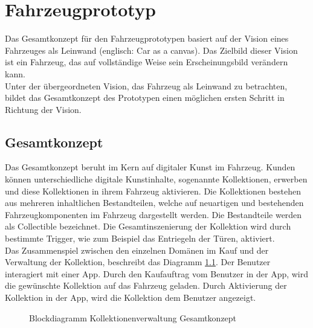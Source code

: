 \chapter{Fahrzeugprototyp}
\label{cha:Prototyp}
Das Gesamtkonzept für den Fahrzeugprototypen basiert auf der Vision eines \glqq Fahrzeuges als Leinwand\grqq{} (englisch: \glqq Car as a canvas\grqq{}). Das Zielbild dieser Vision ist ein Fahrzeug, das auf vollständige Weise sein Erscheinungsbild verändern kann. \\
Unter der übergeordneten Vision, das Fahrzeug als Leinwand zu betrachten, bildet das Gesamtkonzept des Prototypen einen möglichen ersten Schritt in Richtung der Vision.
\section{Gesamtkonzept}
Das Gesamtkonzept beruht im Kern auf digitaler Kunst im Fahrzeug. Kunden können unterschiedliche digitale Kunstinhalte, sogenannte Kollektionen, erwerben und diese Kollektionen in ihrem Fahrzeug aktivieren. Die Kollektionen bestehen aus mehreren inhaltlichen Bestandteilen, welche auf neuartigen und bestehenden Fahrzeugkomponenten im Fahrzeug dargestellt werden. Die Bestandteile werden als \glqq Collectible\grqq{} bezeichnet. Die Gesamtinszenierung der Kollektion wird durch bestimmte Trigger, wie zum Beispiel das Entriegeln der Türen, aktiviert. \\
Das Zusammenspiel zwischen den einzelnen Domänen im Kauf und der Verwaltung der Kollektion, beschreibt das Diagramm \ref{fig:gesamtkonzept}. Der Benutzer interagiert mit einer App. Durch den Kaufauftrag vom Benutzer in der App, wird die gewünschte Kollektion auf das Fahrzeug geladen. Durch Aktivierung der Kollektion in der App, wird die Kollektion dem Benutzer angezeigt. \\
\begin{figure}[hbt]
	\centering
	
	\caption[Blockdiagramm Kollektionenverwaltung Gesamtkonzept]{Blockdiagramm Kollektionenverwaltung Gesamtkonzept}
	\label{fig:gesamtkonzept}
\end{figure}

